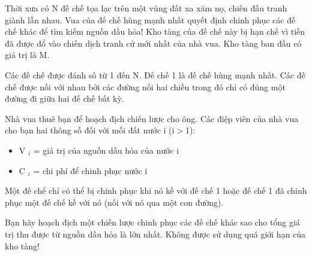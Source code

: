 Thời xưa có N đế chế tọa lạc trên một vùng đất xa xăm nọ, chiến đấu tranh giành lẫn nhau. Vua của đế chế hùng mạnh nhất quyết định chinh phục các đế chế khác để tìm kiếm nguồn dầu hỏa! Kho tàng của đế chế này bị hạn chế vì tiền đã được đổ vào chiến dịch tranh cử mới nhất của nhà vua. Kho tàng ban đầu có giá trị là M.

Các đế chế được đánh số từ 1 đến N. Đế chế 1 là đế chế hùng mạnh nhất. Các đế chế được nối với nhau bởi các đường nối hai chiều trong đó chỉ có đúng một đường đi giữa hai đế chế bất kỳ.

Nhà vua thuê bạn để hoạch địch chiến lược cho ông. Các điệp viên của nhà vua cho bạn hai thông số đối với mỗi đất nước i (i$>$1):
\begin{itemize}
	\item V $_ i $ = giá trị của nguồn dầu hỏa của nước i
	\item C $_ i $ = chi phí để chinh phục nước i
\end{itemize}

Một đế chể chỉ có thể bị chinh phục khi nó kề với đế chế 1 hoặc đế chế 1 đã chinh phục một đế chế kề với nó (nối với nó qua một con đường).

Bạn hãy hoạch địch một chiến lược chinh phục các đế chế khác sao cho tổng giá trị thu được từ nguồn dầu hỏa là lớn nhất. Không được sử dụng quá giới hạn của kho tàng!

\